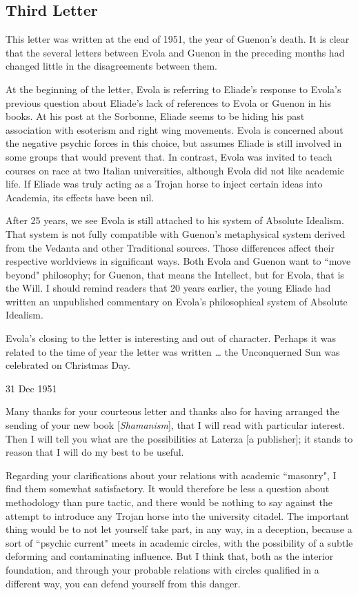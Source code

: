 \subsection{Third Letter}

\begin{quotex}
This letter was written at the end of 1951, the year of Guenon's death. It is clear that the several letters between Evola and Guenon in the preceding months had changed little in the disagreements between them.

At the beginning of the letter, Evola is referring to Eliade's response to Evola's previous question about Eliade's lack of references to Evola or Guenon in his books. At his post at the Sorbonne, Eliade seems to be hiding his past association with esoterism and right wing movements. Evola is concerned about the negative psychic forces in this choice, but assumes Eliade is still involved in some groups that would prevent that. In contrast, Evola was invited to teach courses on race at two Italian universities, although Evola did not like academic life. If Eliade was truly acting as a Trojan horse to inject certain ideas into Academia, its effects have been nil.

After 25 years, we see Evola is still attached to his system of Absolute Idealism. That system is not fully compatible with Guenon's metaphysical system derived from the Vedanta and other Traditional sources. Those differences affect their respective worldviews in significant ways. Both Evola and Guenon want to ``move beyond" philosophy; for Guenon, that means the Intellect, but for Evola, that is the Will. I should remind readers that 20 years earlier, the young Eliade had written an unpublished commentary on Evola's philosophical system of Absolute Idealism.

Evola's closing to the letter is interesting and out of character. Perhaps it was related to the time of year the letter was written … the Unconquerned Sun was celebrated on Christmas Day.

\end{quotex}
31 Dec 1951

Many thanks for your courteous letter and thanks also for having arranged the sending of your new book [\emph{Shamanism}], that I will read with particular interest. Then I will tell you what are the possibilities at Laterza [a publisher]; it stands to reason that I will do my best to be useful.

Regarding your clarifications about your relations with academic ``masonry", I find them somewhat satisfactory. It would therefore be less a question about methodology than pure tactic, and there would be nothing to say against the attempt to introduce any Trojan horse into the university citadel. The important thing would be to not let yourself take part, in any way, in a deception, because a sort of ``psychic current" meets in academic circles, with the possibility of a subtle deforming and contaminating influence. But I think that, both as the interior foundation, and through your probable relations with circles qualified in a different way, you can defend yourself from this danger.

